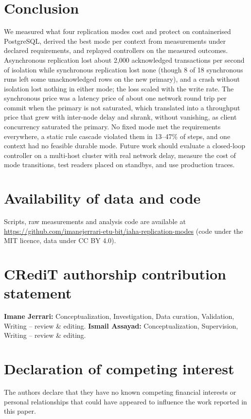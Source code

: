 \documentclass[preprint,12pt]{elsarticle}
\begin{document}
\section{Conclusion}\label{sec:conclusion}
We measured what four replication modes cost and protect on containerised PostgreSQL, derived the best mode per context from measurements under declared requirements, and replayed controllers on the measured outcomes. Asynchronous replication lost about 2,000 acknowledged transactions per second of isolation while synchronous replication lost none (though 8 of 18 synchronous runs left some unacknowledged rows on the new primary), and a crash without isolation lost nothing in either mode; the loss scaled with the write rate. The synchronous price was a latency price of about one network round trip per commit when the primary is not saturated, which translated into a throughput price that grew with inter-node delay and shrank, without vanishing, as client concurrency saturated the primary. No fixed mode met the requirements everywhere, a static rule cascade violated them in 13--47\% of steps, and one context had no feasible durable mode. Future work should evaluate a closed-loop controller on a multi-host cluster with real network delay, measure the cost of mode transitions, test readers placed on standbys, and use production traces.

\section*{Availability of data and code}\label{sec:avail}
Scripts, raw measurements and analysis code are available at \url{https://github.com/imanejerrari-etu-bit/iaha-replication-modes} (code under the MIT licence, data under CC BY 4.0).

\section*{CRediT authorship contribution statement}
\textbf{Imane Jerrari:} Conceptualization, Investigation, Data curation, Validation, Writing -- review \& editing. \textbf{Ismail Assayad:} Conceptualization, Supervision, Writing -- review \& editing.

\section*{Declaration of competing interest}
The authors declare that they have no known competing financial interests or personal relationships that could have appeared to influence the work reported in this paper.
\end{document}
